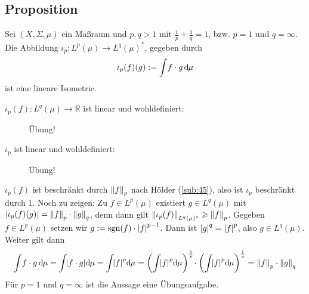 \subsection[Proposition: Lineare Isometrie $\iota_p \colon L^p(\mu) \to L^q(\mu)^*$]{Proposition} %
\label{sub:410}
Sei $(X,\Sigma,\mu)$ ein Maßraum und $p,q >1$ mit $\frac{1}{p} + \frac{1}{q}=1$, bzw. $p=1$ und $q=\infty$. Die Abbildung $\iota_p \colon L^p(\mu) \to L^q(\mu)^*$, gegeben 
durch
\[
	\iota_p(f)(g) := \int \! f \cdot g \, \mathd \mu
\]
ist eine lineare Isometrie.
\begin{description}
	\item[$\iota_p(f) \colon L^q(\mu) \to \mathds{R}$ ist linear und wohldefiniert:] Übung!
	\item[$\iota_p$ ist linear und wohldefiniert:] Übung!
\end{description}
$\iota_p(f)$ ist beschränkt durch $\norm[p]{f}$ nach Hölder (\ref{sub:45}), also ist $\iota_p$ beschränkt durch $1$. Noch zu zeigen: Zu $f \in L^p(\mu)$ existiert 
$g \in L^q(\mu)$ mit $\abs*{\iota_p(f)(g)} = \norm[p]{f} \cdot \norm[q]{g}$, denn dann gilt $\norm[L^q(\mu)^*]{\iota_p(f)}  \ge \norm[p]{f}$.
Gegeben $f \in L^p(\mu)$ setzen wir $g := \sgn(f) \cdot \abs*{f}^{p-1}$. Dann ist $\abs*{g}^q= \abs*{f}^p$, also $g \in L^q(\mu)$. Weiter gilt dann
\begin{align*}
	\int \!f \cdot g \,\mathd \mu = \int \! \abs*{f \cdot g} \mathd \mu = \int \!\abs*{f}^p \mathd \mu  = \enbrace*{\int\! \abs*{f}^p \mathd \mu }^{\frac{1}{p}}
	\!\cdot  \enbrace*{\int \!  \abs*{f}^p \mathd\mu}^{\frac{1}{q}} = \norm[p]{f} \cdot \norm[q]{g}    
\end{align*}
Für $p=1$ und $q=\infty$ ist die Aussage eine Übungsaufgabe. \bewende

